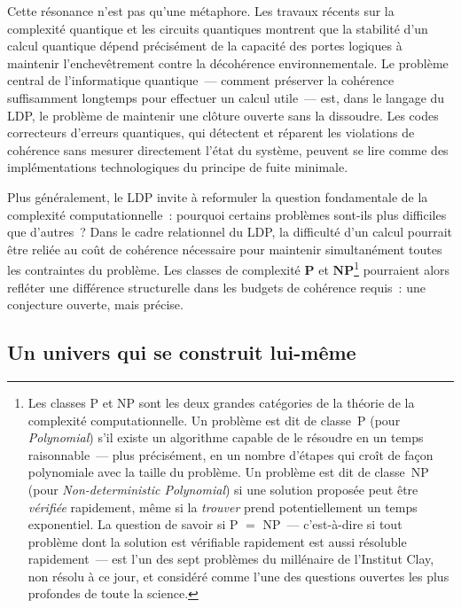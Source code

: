 \documentclass[12pt, a4paper, openright]{book}
\begin{document}
\medskip

Cette résonance n'est pas qu'une métaphore. Les travaux récents sur la complexité quantique et les circuits quantiques montrent que la stabilité d'un calcul quantique dépend précisément de la capacité des portes logiques à maintenir l'enchevêtrement contre la décohérence environnementale. Le problème central de l'informatique quantique~--- comment préserver la cohérence suffisamment longtemps pour effectuer un calcul utile~--- est, dans le langage du LDP, le problème de maintenir une clôture ouverte sans la dissoudre. Les codes correcteurs d'erreurs quantiques, qui détectent et réparent les violations de cohérence sans mesurer directement l'état du système, peuvent se lire comme des implémentations technologiques du principe de fuite minimale.

\medskip

Plus généralement, le LDP invite à reformuler la question fondamentale de la complexité computationnelle~: pourquoi certains problèmes sont-ils plus difficiles que d'autres~? Dans le cadre relationnel du LDP, la difficulté d'un calcul pourrait être reliée au coût de cohérence nécessaire pour maintenir simultanément toutes les contraintes du problème. Les classes de complexité $\mathbf{P}$ et $\mathbf{NP}$\footnote{Les classes P et NP sont les deux grandes catégories de la théorie de la complexité computationnelle. Un problème est dit de classe~P (pour \textit{Polynomial}) s'il existe un algorithme capable de le résoudre en un temps raisonnable~--- plus précisément, en un nombre d'étapes qui croît de façon polynomiale avec la taille du problème. Un problème est dit de classe~NP (pour \textit{Non-deterministic Polynomial}) si une solution proposée peut être \emph{vérifiée} rapidement, même si la \emph{trouver} prend potentiellement un temps exponentiel. La question de savoir si P $=$ NP~--- c'est-à-dire si tout problème dont la solution est vérifiable rapidement est aussi résoluble rapidement~--- est l'un des sept problèmes du millénaire de l'Institut Clay, non résolu à ce jour, et considéré comme l'une des questions ouvertes les plus profondes de toute la science.} pourraient alors refléter une différence structurelle dans les budgets de cohérence requis~: une conjecture ouverte, mais précise.

\subsection*{Un univers qui se construit lui-même}
\end{document}
